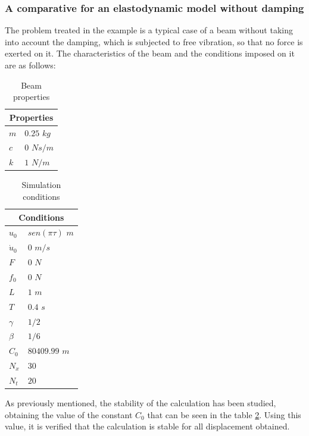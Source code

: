 \documentclass{ws-m3as}
\begin{document}
\subsubsection{A comparative for an elastodynamic model without damping}

The problem treated in the example is a typical case of a beam without taking into account the damping, which is subjected to free vibration, so that no force is exerted on it. The characteristics of the beam and the conditions imposed on it are as follows:

\begin{table}[htb]
\centering
\caption{Beam properties}
\label{tabla:propiedadesNoDamping}
\begin{tabular}{|l|l|}
\hline
\multicolumn{2}{|c|}{Properties} \\ \hline
$m$ & $0.25$ $kg$ \\
$c$ & $0$ $N s/m$\\
$k$ & $1$ $N/m$\\
\hline
\end{tabular}
\end{table}


\begin{table}[htb]
\centering
\caption{Simulation conditions}
\label{tabla:condicionesNoDamping}
\begin{tabular}{|l|l|}
\hline
\multicolumn{2}{|c|}{Conditions} \\ \hline
$u_0$ & $sen(\pi \tau)$ $m$ \\
$\dot{u}_0$ & $0$ $m/s$\\
$F$ & $0$ $N$\\
$f_0$ & $0$ $N$\\
$L$ & $1$ $m$\\
$T$ & $0.4$ $s$\\
$\gamma$ & $1/2$\\
$\beta$ & $1/6$ \\
$C_0$ & $80409.99$ $m$ \\
$N_x$ & $30$  \\
$N_t$ & $20$  \\
\hline
\end{tabular}
\end{table}

As previously mentioned, the stability of the calculation has been studied, obtaining the value of the constant $C_0$ that can be seen in the table \ref{tabla:condicionesNoDamping}. Using this value, it is verified that the calculation is stable for all displacement obtained.\\
\end{document}
